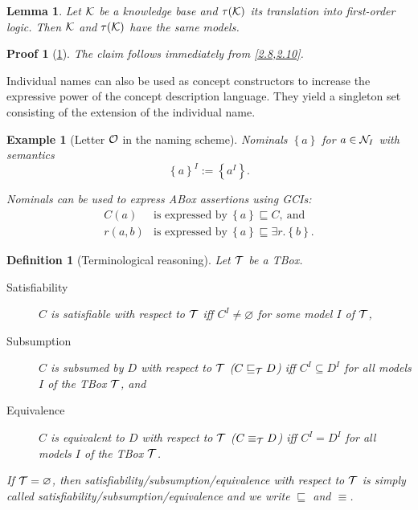 \documentclass[openany]{scrbook}
\theoremstyle{break}
\newtheorem{Lemma}[Theorem]{Lemma}
\newtheorem{Definition}[Theorem]{Definition}
\theoremstyle{nonumberbreak}
\newtheorem{Example}{Example}
\theoremstyle{nonumberplain}
\theoremstyle{nonumberbreak}
\newtheorem{Proof}{Proof}
\newcommand{\set}[1]{\left\{#1\right\}}
\begin{document}
\begin{Lemma}
  \label{2.12}
  Let ${\cal K}$ be a knowledge base and $\tau({\cal K})$ its
  translation into first-order logic. Then ${\cal K}$ and $\tau({\cal
    K})$ have the same models.
\end{Lemma}

\begin{Proof}[\cref{2.12}]
  The claim follows immediately from \cref{2.8,2.10}.
\end{Proof}

Individual names can also be used as concept constructors to increase
the expressive power of the concept description language. They yield a
singleton set consisting of the extension of the individual name.

\begin{Example}[Letter ${\cal O}$ in the naming scheme]
  Nominals $\set{a}$ for $a \in {\cal N}_I$ with semantics
  \begin{equation*}
    \set{a}^I := \set{a^I}.
  \end{equation*}

  Nominals can be used to express ABox assertions using GCIs:
  \begin{align*}
    C(a) & \text{is expressed by}\ \set{a} \sqsubseteq C,\ \text{and} \\
    r(a, b) & \text{is expressed by}\ \set{a} \sqsubseteq \exists r.\set{b}.
  \end{align*}
\end{Example}

\begin{Definition}[Terminological reasoning]
  Let ${\cal T}$ be a TBox.
  \begin{description}
  \item[Satisfiability] $C$ is satisfiable with respect to ${\cal T}$
    iff $C^I \ne \varnothing$ for some model $I$ of ${\cal T}$,
  \item[Subsumption] $C$ is subsumed by $D$ with respect to ${\cal T}$
    ($C \sqsubseteq_{\cal T} D$) iff $C^I \subseteq D^I$ for all
    models $I$ of the TBox ${\cal T}$, and
  \item[Equivalence] $C$ is equivalent to $D$ with respect to ${\cal
      T}$ ($C \equiv_{\cal T} D$) iff $C^I = D^I$ for all models $I$
    of the TBox ${\cal T}$.
  \end{description}

  If ${\cal T} = \varnothing$, then
  satisfiability/subsumption/equivalence with respect to ${\cal T}$ is
  simply called satisfiability/subsumption/equivalence and we write
  $\sqsubseteq$ and $\equiv$.
\end{Definition}
\end{document}
